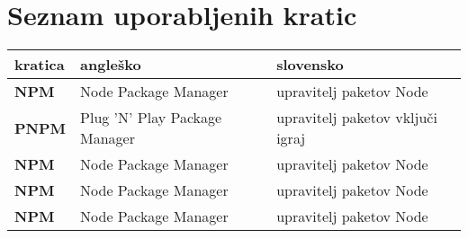\chapter*{Seznam uporabljenih kratic}

\begin{tabular}{l|l|l}
  {\bf kratica} & {\bf angleško} & {\bf slovensko} \\ \hline
  {\bf NPM} & Node Package Manager & upravitelj paketov Node \\
  {\bf PNPM} & Plug 'N' Play Package Manager & upravitelj paketov vključi igraj \\
  {\bf NPM} & Node Package Manager & upravitelj paketov Node \\
  {\bf NPM} & Node Package Manager & upravitelj paketov Node \\
  {\bf NPM} & Node Package Manager & upravitelj paketov Node \\
  
\end{tabular}